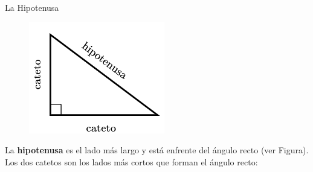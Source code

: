 \begin{infocard}{La Hipotenusa}
    \begin{minipage}{0.36\textwidth}
        \begin{figure}[H]
            \centering
            \includegraphics[width=0.99\linewidth]{../images/20230402132954.png}
        \end{figure}
    \end{minipage}\hfill
    \begin{minipage}{0.63\textwidth}
        La \textbf{hipotenusa} es el lado más largo y está enfrente del ángulo recto (ver Figura). Los dos catetos son los lados más cortos que forman el ángulo recto:
    \end{minipage}
\end{infocard}%